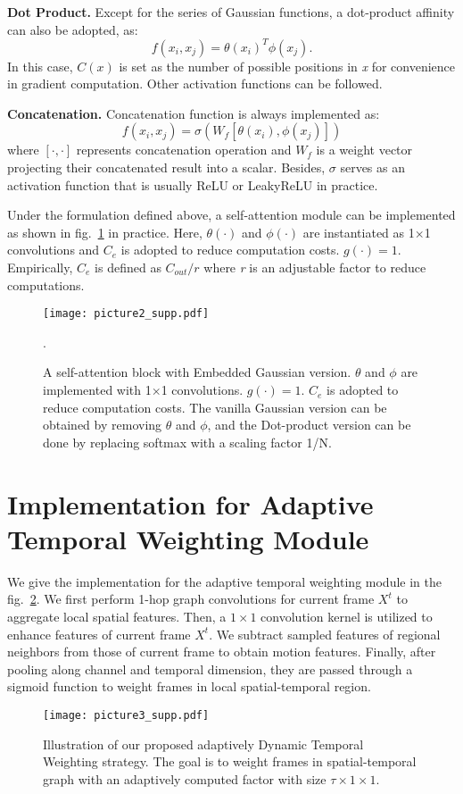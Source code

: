 \documentclass[runningheads]{llncs}
\begin{document}
\textbf{Dot Product.} Except for the series of Gaussian functions, a dot-product affinity can also be adopted, as:
\begin{equation}
    \label{e8}
    f(x_{i},x_{j})= \theta(x_{i})^{T}\phi(x_{j}).
\end{equation}
In this case, $C(x)$ is set as the number of possible positions in \textit{x} for convenience in gradient computation. Other activation functions can be followed.

\textbf{Concatenation.} Concatenation function is always implemented as:
\begin{equation}
    \label{e9}
    f(x_{i},x_{j})= \sigma({W_f[\theta(x_{i}),\phi(x_{j})]})
\end{equation}
where $[\cdot,\cdot]$ represents concatenation operation and $W_f$ is a weight vector projecting their concatenated result into a scalar. Besides, $\sigma$ serves as an activation function that is usually ReLU or LeakyReLU in practice.

Under the formulation defined above, a self-attention module can be implemented as shown in fig.~\ref{fig2} in practice. Here, $\theta(\cdot)$ and $\phi(\cdot)$ are instantiated as 1$\times$1 convolutions and $C_e$ is adopted to reduce computation costs. $g(\cdot)=1$. Empirically, $C_e$ is defined as $C_{out}/r$ where \textit{r} is an adjustable factor to reduce computations.

\begin{figure}[t]
    \centering
    \texttt{[image: picture2\_supp.pdf]} \caption{A self-attention block with Embedded Gaussian version. $\theta$ and $\phi$ are implemented with 1$\times$1 convolutions. $g(\cdot)=1$. $C_e$ is adopted to reduce computation costs. The vanilla Gaussian version can be obtained by removing $\theta$ and $\phi$, and the Dot-product version can be done by replacing softmax with a scaling factor 1/N. }.
    \label{fig2}
\end{figure}

\section{Implementation for Adaptive Temporal Weighting Module}
We give the implementation for the adaptive temporal weighting module in the fig.~\ref{fig3}. We first perform 1-hop graph convolutions for current frame $X^{t}$ to aggregate local spatial features. Then, a $1\times 1$ convolution kernel is utilized to enhance features of current frame $X^{t}$. We subtract sampled features of regional neighbors from those of current frame to obtain motion features. Finally, after pooling along channel and temporal dimension, they are passed through a sigmoid function to weight frames in local spatial-temporal region.
\begin{figure}[h]
    \centering
    \texttt{[image: picture3\_supp.pdf]} \caption{ Illustration of our proposed adaptively Dynamic Temporal Weighting strategy. The goal is to weight frames in spatial-temporal graph with an adaptively computed factor with size $\tau\times 1\times 1 $.}
    \label{fig3}
\end{figure}
\end{document}
